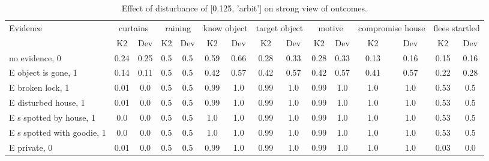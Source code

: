 \begin{table}\begin{tabular}{l|cc|cc|cc|cc|cc|cc|cc}\toprule\multirow{2}{*}{Evidence} & \multicolumn{2}{c}{curtains}& \multicolumn{2}{c}{raining}& \multicolumn{2}{c}{know object}& \multicolumn{2}{c}{target object}& \multicolumn{2}{c}{motive}& \multicolumn{2}{c}{compromise house}& \multicolumn{2}{c}{flees startled}\\& {K2} & {Dev}& {K2} & {Dev}& {K2} & {Dev}& {K2} & {Dev}& {K2} & {Dev}& {K2} & {Dev}& {K2} & {Dev}\\\midrule
no evidence, 0 & 0.24&0.25&0.5&0.5&\cellcolor{Bittersweet}0.59&\cellcolor{Bittersweet}0.66&0.28&0.33&0.28&0.33&0.13&0.16&0.15&0.16\\E object is gone, 1 & 0.14&0.11&0.5&0.5&\cellcolor{Bittersweet}0.42&\cellcolor{Bittersweet}0.57&\cellcolor{Bittersweet}0.42&\cellcolor{Bittersweet}0.57&\cellcolor{Bittersweet}0.42&\cellcolor{Bittersweet}0.57&\cellcolor{Bittersweet}0.41&\cellcolor{Bittersweet}0.57&\cellcolor{Bittersweet}0.22&\cellcolor{Bittersweet}0.28\\E broken lock, 1 & 0.01&0.0&0.5&0.5&0.99&1.0&0.99&1.0&0.99&1.0&1.0&1.0&0.53&0.5\\E disturbed house, 1 & 0.01&0.0&0.5&0.5&0.99&1.0&0.99&1.0&0.99&1.0&1.0&1.0&0.53&0.5\\E s spotted by house, 1 & 0.0&0.0&0.5&0.5&1.0&1.0&0.99&1.0&0.99&1.0&1.0&1.0&0.53&0.5\\E s spotted with goodie, 1 & 0.0&0.0&0.5&0.5&1.0&1.0&0.99&1.0&0.99&1.0&1.0&1.0&0.53&0.5\\E private, 0 & 0.01&0.0&0.5&0.5&0.99&1.0&0.99&1.0&0.99&1.0&1.0&1.0&0.03&0.0\\\bottomrule\end{tabular}\caption{Effect of disturbance of [0.125, 'arbit'] on strong view of outcomes.}\end{table}